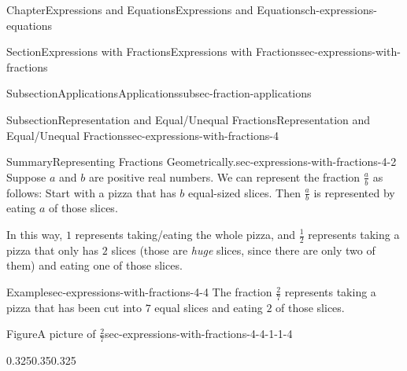 \documentclass[twoside,11pt,]{book}
\numberwithin{equation}{chapter}
\begin{document}
\begin{chapterptx}{Chapter}{Expressions and Equations}{}{Expressions and Equations}{}{}{ch-expressions-equations}
\begin{sectionptx}{Section}{Expressions with Fractions}{}{Expressions with Fractions}{}{}{sec-expressions-with-fractions}
\begin{subsectionptx}{Subsection}{Applications}{}{Applications}{}{}{subsec-fraction-applications}
\begin{enumerate}
\end{enumerate}
%
\end{subsectionptx}
%
%
\typeout{************************************************}
\typeout{************************************************}
%
\begin{subsectionptx}{Subsection}{Representation and Equal\slash{}Unequal Fractions}{}{Representation and Equal\slash{}Unequal Fractions}{}{}{sec-expressions-with-fractions-4}
\begin{assemblage}{Summary}{Representing Fractions Geometrically.}{sec-expressions-with-fractions-4-2}%
Suppose \(a\) and \(b\) are positive real numbers. We can represent the fraction \(\frac{a}{b}\) as follows: Start with a pizza that has \(b\) equal-sized slices. Then \(\frac{a}{b}\) is represented by eating \(a\) of those slices.%
\end{assemblage}
In this way, \(1\) represents taking\slash{}eating the whole pizza, and \(\frac{1}{2}\) represents taking a pizza that only has \(2\) slices (those are \emph{huge} slices, since there are only two of them) and eating one of those slices.%
\begin{example}{Example}{}{sec-expressions-with-fractions-4-4}%
The fraction \(\frac27\) represents taking a pizza that has been cut into \(7\) equal slices and eating \(2\) of those slices. \begin{figureptx}{Figure}{A picture of \(\frac27\)}{sec-expressions-with-fractions-4-4-1-1-4}{}%
\begin{image}{0.325}{0.35}{0.325}{}%
%
\end{image}%
\tcblower
\end{figureptx}%
%
\end{example}

\end{subsectionptx}
\end{sectionptx}
\end{chapterptx}
\end{document}

